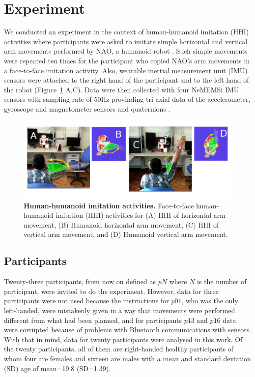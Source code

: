 \documentclass[fleqn,10pt]{wlscirep}
\begin{document}
\section*{Experiment} \label{sec:experiment}
We conducted an experiment in the context of human-humanoid imitation (HHI) 
activities where participants were asked to imitate simple horizontal and 
vertical arm movements performed by NAO, a humanoid robot \cite{gouaillier2009}.
Such simple movements were repeated ten times for the participant 
who copied NAO's arm movements in a face-to-face imitation activity.
Also, wearable inertial measurement unit (IMU) sensors were attached 
to the right hand of the participant and to the left hand of the robot 
(Figure~\ref{fig:hri} A,C). Data were then collected with four NeMEMSi 
IMU sensors with sampling rate of 50Hz provinding tri-axial data of the 
accelerometer, gyroscope and magnetometer sensors and quaternions 
\cite{Comotti2014}.
\begin{figure}[ht]
  \centering
\includegraphics[width=1.0\textwidth]{figures/experiment/hri/pdf/hri}
    \caption{
	{\bf Human-humanoid imitation activities.} 
    		Face-to-face human-humanoid imitation (HHI) activities for 
		(A) HHI of horizontal arm movement, 
		(B) Humanoid horizontal arm movement,
		(C) HHI of vertical arm movement, and 
		(D) Humanoid vertical arm movement.
        }
    \label{fig:hri}
\end{figure}

\subsection*{Participants}
Twenty-three participants,
from now on defined as $pN$ where $N$ is the number of participant, were 
invited to do the experiment. However, data for three participants were 
not used because the instructions for $p01$, who was the only left-handed,
were mistakenly given in a way that movements were performed different
from what had been planned, and for participants $p13$ and $p16$ 
data were corrupted because of problems with Bluetooth communications with sensors. 
With that in mind, data for twenty participants were analysed in this work.
Of the twenty participants, all of them are right-handed healthy participants 
of whom four are females and sixteen are males with a mean and standard 
deviation (SD) age of mean=19.8 (SD=1.39). 
\end{document}

